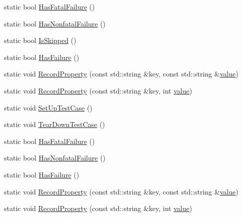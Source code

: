 \begin{DoxyCompactItemize}
\item 
static bool \mbox{\hyperlink{classtesting_1_1_test_a0a89846458f0e8ed1c9457c957e8182a}{Has\+Fatal\+Failure}} ()
\item 
static bool \mbox{\hyperlink{classtesting_1_1_test_a07e896f1b1836f8ac075c26d7b7c9fb8}{Has\+Nonfatal\+Failure}} ()
\item 
static bool \mbox{\hyperlink{classtesting_1_1_test_a1723aea1d7bd468265f4134241596752}{Is\+Skipped}} ()
\item 
static bool \mbox{\hyperlink{classtesting_1_1_test_a7a00be7dd0a6bfdc8d47a1b784623613}{Has\+Failure}} ()
\item 
static void \mbox{\hyperlink{classtesting_1_1_test_ae0448aec9e389fab70f6a75a59ff6aa2}{Record\+Property}} (const std\+::string \&key, const std\+::string \&\mbox{\hyperlink{_obj__test_2lib_2googletest-master_2googlemock_2test_2gmock-matchers__test_8cc_a337b8a670efc0b086ad3af163f3121b6}{value}})
\item 
static void \mbox{\hyperlink{classtesting_1_1_test_af602903efb17730b977304fc56500881}{Record\+Property}} (const std\+::string \&key, int \mbox{\hyperlink{_obj__test_2lib_2googletest-master_2googlemock_2test_2gmock-matchers__test_8cc_a337b8a670efc0b086ad3af163f3121b6}{value}})
\item 
static void \mbox{\hyperlink{classtesting_1_1_test_a5ccbac42fee8c5b00b0bfe89b6c49d79}{Set\+Up\+Test\+Case}} ()
\item 
static void \mbox{\hyperlink{classtesting_1_1_test_af374706cbaf0ffc460f4fd04e7c150f1}{Tear\+Down\+Test\+Case}} ()
\item 
static bool \mbox{\hyperlink{classtesting_1_1_test_a0a89846458f0e8ed1c9457c957e8182a}{Has\+Fatal\+Failure}} ()
\item 
static bool \mbox{\hyperlink{classtesting_1_1_test_a07e896f1b1836f8ac075c26d7b7c9fb8}{Has\+Nonfatal\+Failure}} ()
\item 
static bool \mbox{\hyperlink{classtesting_1_1_test_a7a00be7dd0a6bfdc8d47a1b784623613}{Has\+Failure}} ()
\item 
static void \mbox{\hyperlink{classtesting_1_1_test_ae0448aec9e389fab70f6a75a59ff6aa2}{Record\+Property}} (const std\+::string \&key, const std\+::string \&\mbox{\hyperlink{_obj__test_2lib_2googletest-master_2googlemock_2test_2gmock-matchers__test_8cc_a337b8a670efc0b086ad3af163f3121b6}{value}})
\item 
static void \mbox{\hyperlink{classtesting_1_1_test_af602903efb17730b977304fc56500881}{Record\+Property}} (const std\+::string \&key, int \mbox{\hyperlink{_obj__test_2lib_2googletest-master_2googlemock_2test_2gmock-matchers__test_8cc_a337b8a670efc0b086ad3af163f3121b6}{value}})
\end{DoxyCompactItemize}
